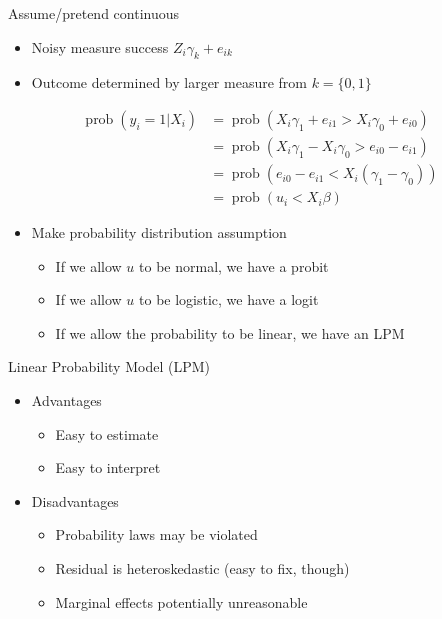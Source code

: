\documentclass[
  ignorenonframetext,
]{beamer}
\providecommand{\tightlist}{%
  \setlength{\itemsep}{0pt}\setlength{\parskip}{0pt}}
\DeclareMathOperator{\prob}{prob}
\begin{document}
\begin{frame}{Assume/pretend continuous}
\protect{}\label{assumepretend-continuous}
\begin{itemize}
\tightlist
\item
  Noisy measure success \(Z_i\gamma_k+e_{ik}\)
\item
  Outcome determined by larger measure from \(k=\{0,1\}\)
\end{itemize}

\[
\begin{split}
\prob(y_i=1|X_i) &= \prob(X_i\gamma_1+e_{i1}>X_i\gamma_0 +e_{i0}) \\
&= \prob(X_i\gamma_1 - X_i\gamma_0>e_{i0}-e_{i1}) \\
&= \prob(e_{i0}-e_{i1}<X_i(\gamma_1-\gamma_0)) \\
&= \prob(u_i<X_i\beta)
\end{split}
\]

\begin{itemize}
\tightlist
\item
  Make probability distribution assumption

  \begin{itemize}
  \tightlist
  \item
    If we allow \(u\) to be normal, we have a probit
  \item
    If we allow \(u\) to be logistic, we have a logit
  \item
    If we allow the probability to be linear, we have an LPM
  \end{itemize}
\end{itemize}
\end{frame}

\begin{frame}{Linear Probability Model (LPM)}
\protect{}\label{linear-probability-model-lpm}
\begin{itemize}
\tightlist
\item
  Advantages

  \begin{itemize}
  \tightlist
  \item
    Easy to estimate
  \item
    Easy to interpret
  \end{itemize}
\item
  Disadvantages

  \begin{itemize}
  \tightlist
  \item
    Probability laws may be violated
  \item
    Residual is heteroskedastic (easy to fix, though)
  \item
    Marginal effects potentially unreasonable
  \end{itemize}
\end{itemize}
\end{frame}
\end{document}
